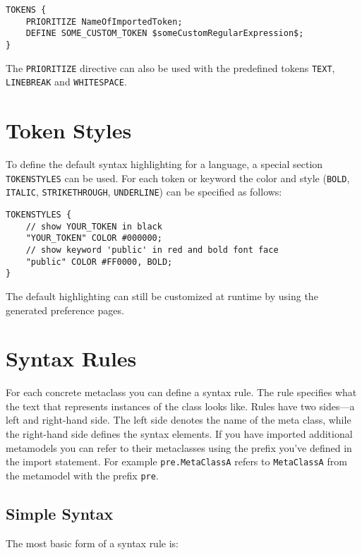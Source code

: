 \lstset{language=CS}
\begin{lstlisting}
TOKENS {
	PRIORITIZE NameOfImportedToken;
	DEFINE SOME_CUSTOM_TOKEN $someCustomRegularExpression$;
}
\end{lstlisting}

The \texttt{PRIORITIZE} directive can also be used with the predefined tokens 
\texttt{TEXT}, \texttt{LINEBREAK} and \texttt{WHITESPACE}.

\section{Token Styles}

To define the default syntax highlighting for a language, a special section
\texttt{TOKENSTYLES} can be used. For each token or keyword the color and
style (\texttt{BOLD}, \texttt{ITALIC}, \texttt{STRIKETHROUGH},
\texttt{UNDERLINE}) can be specified as follows:

\lstset{language=CS}
\begin{lstlisting}
TOKENSTYLES {
    // show YOUR_TOKEN in black
    "YOUR_TOKEN" COLOR #000000;
    // show keyword 'public' in red and bold font face
    "public" COLOR #FF0000, BOLD;
}
\end{lstlisting}

The default highlighting can still be customized at runtime by
using the generated preference pages.

\section{Syntax Rules}

For each concrete metaclass you can define a syntax rule. The rule specifies
what the text that represents instances of the class looks like. Rules have two
sides---a left and right-hand side. The left side denotes the name of the meta
class, while the right-hand side defines the syntax elements. If you have 
imported additional metamodels you can refer to their metaclasses using the 
prefix you've defined in the import statement. For example \texttt{pre.MetaClassA} refers to 
\texttt{MetaClassA} from the metamodel with the prefix \texttt{pre}.
 
\subsection{Simple Syntax}

The most basic form of a syntax rule is:

